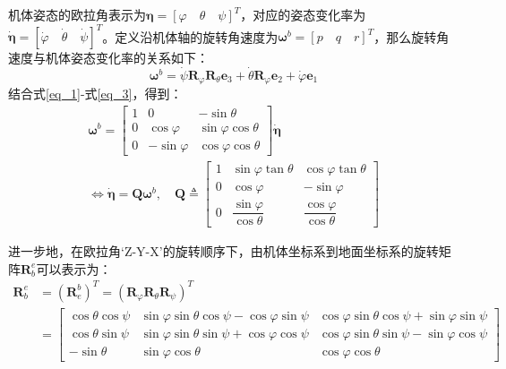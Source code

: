 机体姿态的欧拉角表示为$\boldsymbol{\eta}=[\varphi \quad \theta \quad \psi]^T$，对应的姿态变化率为$\boldsymbol{\dot{\eta}}=[\dot{\varphi} \quad \dot{\theta} \quad \dot{\psi}]^T$。定义沿机体轴的旋转角速度为$\boldsymbol{\omega}^b=[p \quad q \quad r]^T$，那么旋转角速度与机体姿态变化率的关系如下\cite{ducard2009fault}：
\begin{equation}
    \boldsymbol\omega^{b}=\dot{\psi}\boldsymbol{R}_{\varphi} \boldsymbol{R}_{\theta} \boldsymbol{e}_{3}+\dot{\theta}\boldsymbol{R}_{\varphi}\boldsymbol{e}_{2}+\dot{\varphi}\boldsymbol{e}_{1}\label{eq_3}
\end{equation}
结合式\eqref{eq_1}-式\eqref{eq_3}，得到：
\begin{equation}
    \begin{gathered}
    \boldsymbol\omega^{b}=
    \begin{bmatrix}
    1 & 0 & -\sin\theta \\
    0 & \cos\varphi & \sin\varphi\cos\theta \\
    0 & -\sin\varphi & \cos\varphi\cos\theta
    \end{bmatrix}
    \boldsymbol{\dot{\eta}}
    \\
    \Leftrightarrow\dot{\boldsymbol{\eta}}=\boldsymbol{Q}\boldsymbol{\omega}^b,\quad\boldsymbol{Q}\triangleq
    \begin{bmatrix}
        1 & \sin\varphi\tan\theta & \cos\varphi\tan\theta \\
        0 & \cos\varphi & -\sin\varphi \\
        0 & \dfrac{\sin\varphi}{\cos\theta} & \dfrac{\cos\varphi}{\cos\theta}
        \end{bmatrix}
    \label{eq_4}
    \end{gathered}
\end{equation}

进一步地，在欧拉角‘Z-Y-X’的旋转顺序下，由机体坐标系到地面坐标系的旋转矩阵$\boldsymbol{R}^e_b$可以表示为：
\begin{equation}
    \begin{aligned}
    \boldsymbol{R}_{b}^{e} & =(\boldsymbol{R}_{e}^{b})^T =(\boldsymbol{R}_\varphi\boldsymbol{R}_\theta\boldsymbol{R}_\psi)^T \\
     & =
    \begin{bmatrix}
    \cos{\theta}\cos{\psi} & \sin{\varphi}\sin{\theta}\cos{\psi}-\cos{\varphi}\sin{\psi} & \cos{\varphi}\sin{\theta}\cos{\psi} + \sin{\varphi}\sin{\psi}
    \\ 
    \cos{\theta}\sin{\psi} & \sin{\varphi}\sin{\theta}\sin{\psi} + \cos{\varphi}\cos{\psi} & \cos{\varphi}\sin{\theta}\sin{\psi} - \sin{\varphi}\cos{\psi}
    \\
    -\sin{\theta} & \sin{\varphi}\cos{\theta} & \cos{\varphi}\cos{\theta}
    \end{bmatrix}
    \label{eq_5}
    \end{aligned}
\end{equation}

